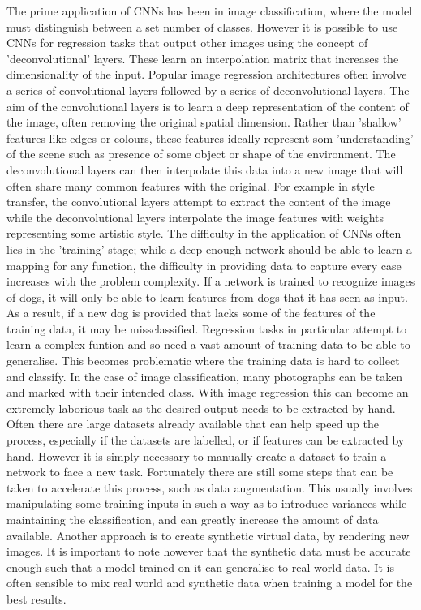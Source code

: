 \documentclass[ %
                    author={Gavin Parker},
                supervisor={Dr. Neill Campbell},
                    degree={MEng},
                     title={Deep Siamese Networks for Illumination Estimation from Stereo Images},
                  subtitle={},
                      type={research},
                      year={2018} ]{dissertation}
\begin{document}
 The prime application of CNNs has been in image classification, where the model must distinguish between a set number of classes. However it is possible to use CNNs for regression tasks that output other images using the concept of 'deconvolutional' layers. These learn an interpolation matrix that increases the dimensionality of the input. Popular image regression architectures often involve a series of convolutional layers followed by a series of deconvolutional layers. The aim of the convolutional layers is to learn a deep representation of the content of the image, often removing the original spatial dimension. Rather than 'shallow' features like edges or colours, these features ideally represent som 'understanding' of the scene such as presence of some object or shape of the environment. The deconvolutional layers can then interpolate this data into a new image that will often share many common features with the original. For example in style transfer, the convolutional layers attempt to extract the content of the image while the deconvolutional layers interpolate the image features with weights representing some artistic style.
\newline
The difficulty in the application of CNNs often lies in the 'training' stage; while a deep enough network should be able to learn a mapping for any function, the difficulty in providing data to capture every case increases with the problem complexity. If a network is trained to recognize images of dogs, it will only be able to learn features from dogs that it has seen as input. As a result, if a new dog is provided that lacks some of the features of the training data, it may be missclassified. Regression tasks in particular attempt to learn a complex funtion and so need a vast amount of training data to be able to generalise. This becomes problematic where the training data is hard to collect and classify. In the case of image classification, many photographs can be taken and marked with their intended class. With image regression this can become an extremely laborious task as the desired output needs to be extracted by hand. Often there are large datasets already available that can help speed up the process, especially if the datasets are labelled, or if features can be extracted by hand. However it is simply necessary to manually create a dataset to train a network to face a new task. Fortunately there are still some steps that can be taken to accelerate this process, such as data augmentation. This usually involves manipulating some training inputs in such a way as to introduce variances while maintaining the classification, and can greatly increase the amount of data available. Another approach is to create synthetic virtual data, by rendering new images. It is important to note however that the synthetic data must be accurate enough such that a model trained on it can generalise to real world data. It is often sensible to mix real world and synthetic data when training a model for the best results.
\end{document}
